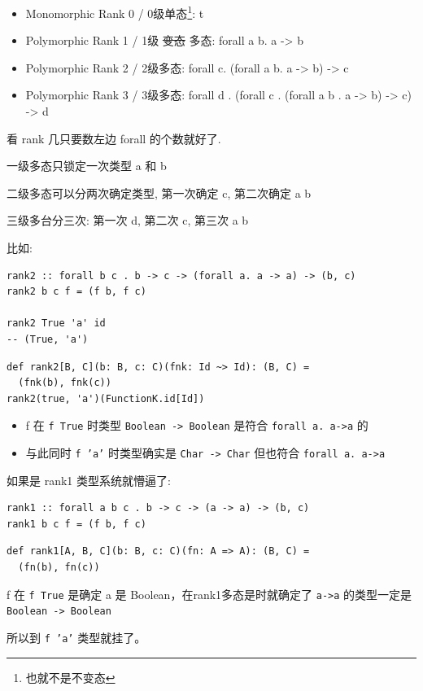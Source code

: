 \documentclass[11pt]{tufte-book}
\begin{document}
\begin{itemize}
\item Monomorphic Rank 0 / 0级单态\footnote{也就不是不变态}: t
\item Polymorphic Rank 1 / 1级 \sout{变态} 多态: forall a b. a -> b
\item Polymorphic Rank 2 / 2级多态: forall c. (forall a b. a -> b) -> c
\item Polymorphic Rank 3 / 3级多态: forall d . (forall c . (forall a b . a -> b) -> c) -> d
\end{itemize}

看 rank 几只要数左边 forall 的个数就好了.

一级多态只锁定一次类型 a 和 b

二级多态可以分两次确定类型, 第一次确定 c, 第二次确定 a b

三级多台分三次: 第一次 d, 第二次 c, 第三次 a b

比如:

\begin{verbatim}
rank2 :: forall b c . b -> c -> (forall a. a -> a) -> (b, c)
rank2 b c f = (f b, f c)

rank2 True 'a' id
-- (True, 'a')
\end{verbatim}

\begin{verbatim}
def rank2[B, C](b: B, c: C)(fnk: Id ~> Id): (B, C) =
  (fnk(b), fnk(c))
rank2(true, 'a')(FunctionK.id[Id])
\end{verbatim}

\begin{itemize}
\item f 在 \texttt{f True} 时类型 \texttt{Boolean -> Boolean} 是符合 \texttt{forall a. a->a} 的
\item 与此同时 \texttt{f 'a'} 时类型确实是 \texttt{Char -> Char} 但也符合 \texttt{forall a. a->a}
\end{itemize}

如果是 rank1 类型系统就懵逼了:
\begin{verbatim}
rank1 :: forall a b c . b -> c -> (a -> a) -> (b, c)
rank1 b c f = (f b, f c)
\end{verbatim}

\begin{verbatim}
def rank1[A, B, C](b: B, c: C)(fn: A => A): (B, C) =
  (fn(b), fn(c))
\end{verbatim}
f 在 \texttt{f True} 是确定 a 是 Boolean，在rank1多态是时就确定了 \texttt{a->a} 的类型一定是 \texttt{Boolean -> Boolean}

所以到 \texttt{f 'a'} 类型就挂了。
\end{document}
